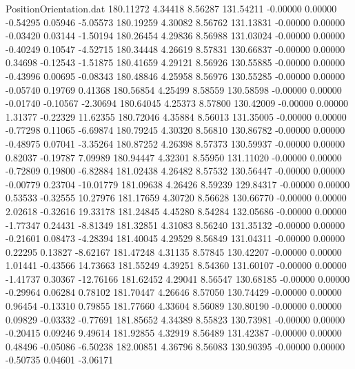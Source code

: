 \begin{filecontents}{PositionOrientation.dat}
 180.11272    4.34418    8.56287   131.54211   -0.00000    0.00000   -0.54295    0.05946   -5.05573
 180.19259    4.30082    8.56762   131.13831   -0.00000    0.00000   -0.03420    0.03144   -1.50194
 180.26454    4.29836    8.56988   131.03024   -0.00000    0.00000   -0.40249    0.10547   -4.52715
 180.34448    4.26619    8.57831   130.66837   -0.00000    0.00000    0.34698   -0.12543   -1.51875
 180.41659    4.29121    8.56926   130.55885   -0.00000    0.00000   -0.43996    0.00695   -0.08343
 180.48846    4.25958    8.56976   130.55285   -0.00000    0.00000   -0.05740    0.19769    0.41368
 180.56854    4.25499    8.58559   130.58598   -0.00000    0.00000   -0.01740   -0.10567   -2.30694
 180.64045    4.25373    8.57800   130.42009   -0.00000    0.00000    1.31377   -0.22329   11.62355
 180.72046    4.35884    8.56013   131.35005   -0.00000    0.00000   -0.77298    0.11065   -6.69874
 180.79245    4.30320    8.56810   130.86782   -0.00000    0.00000   -0.48975    0.07041   -3.35264
 180.87252    4.26398    8.57373   130.59937   -0.00000    0.00000    0.82037   -0.19787    7.09989
 180.94447    4.32301    8.55950   131.11020   -0.00000    0.00000   -0.72809    0.19800   -6.82884
 181.02438    4.26482    8.57532   130.56447   -0.00000    0.00000   -0.00779    0.23704  -10.01779
 181.09638    4.26426    8.59239   129.84317   -0.00000    0.00000    0.53533   -0.32555   10.27976
 181.17659    4.30720    8.56628   130.66770   -0.00000    0.00000    2.02618   -0.32616   19.33178
 181.24845    4.45280    8.54284   132.05686   -0.00000    0.00000   -1.77347    0.24431   -8.81349
 181.32851    4.31083    8.56240   131.35132   -0.00000    0.00000   -0.21601    0.08473   -4.28394
 181.40045    4.29529    8.56849   131.04311   -0.00000    0.00000    0.22295    0.13827   -8.62167
 181.47248    4.31135    8.57845   130.42207   -0.00000    0.00000    1.01441   -0.43566   14.73663
 181.55249    4.39251    8.54360   131.60107   -0.00000    0.00000   -1.41737    0.30367  -12.76166
 181.62452    4.29041    8.56547   130.68185   -0.00000    0.00000   -0.29964    0.06284    0.78102
 181.70447    4.26646    8.57050   130.74429   -0.00000    0.00000    0.96454   -0.13310    0.79855
 181.77660    4.33604    8.56089   130.80190   -0.00000    0.00000    0.09829   -0.03332   -0.77691
 181.85652    4.34389    8.55823   130.73981   -0.00000    0.00000   -0.20415    0.09246    9.49614
 181.92855    4.32919    8.56489   131.42387   -0.00000    0.00000    0.48496   -0.05086   -6.50238
 182.00851    4.36796    8.56083   130.90395   -0.00000    0.00000   -0.50735    0.04601   -3.06171

\end{filecontents}
